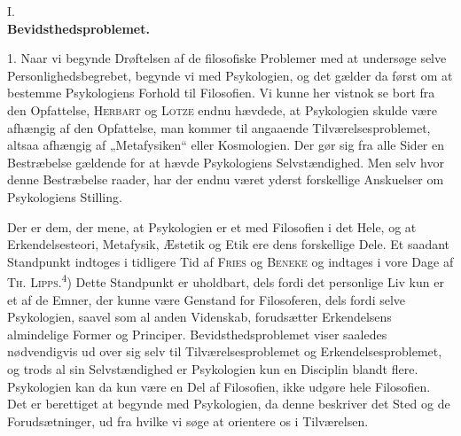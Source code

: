 \documentclass[12pt,a4paper,openany]{book}
\newcommand{\opage}[1]{\marginnote{\footnotesize\textit{[#1]}}}
\begin{document}
\opage{6}

\begin{center}I.\\[6pt]
\textbf{\Large Bevidsthedsproblemet.}\end{center}

1. Naar vi begynde Drøftelsen af de filosofiske Problemer med at undersøge
selve Personlighedsbegrebet, begynde vi med Psykologien, og det gælder da først
om at bestemme Psykologiens Forhold til Filosofien. Vi kunne her vistnok se
bort fra den Opfattelse, \textsc{Herbart} og \textsc{Lotze} endnu hævdede, at
Psykologien skulde være afhængig af den Opfattelse, man kommer til angaaende
Tilværelsesproblemet, altsaa afhængig af „Metafysiken“ eller Kosmologien. Der
gør sig fra alle Sider en Bestræbelse gældende for at hævde Psykologiens
Selvstændighed. Men selv hvor denne Bestræbelse raader, har der endnu været
yderst forskellige Anskuelser om Psykologiens Stilling.

Der er dem, der mene, at Psykologien er et med Filosofien i det Hele, og at
Erkendelsesteori, Metafysik, Æstetik og Etik ere dens forskellige Dele. Et
saadant Standpunkt indtoges i tidligere Tid af \textsc{Fries} og
\textsc{Beneke} og indtages i vore Dage af \textsc{Th.
Lipps}.\textsuperscript{4}) Dette Standpunkt er uholdbart, dels fordi det
personlige Liv kun er et af de Emner, der kunne være Genstand for Filosoferen,
dels fordi selve Psykologien, saavel som al anden Videnskab, forudsætter
Erkendelsens almindelige Former og Principer. Bevidsthedsproblemet viser
saaledes nødvendigvis ud over sig selv til Tilværelsesproblemet og
Erkendelsesproblemet, og trods al sin Selvstændighed er Psykologien kun en
Disciplin blandt flere. Psykologien kan da kun være en Del af Filosofien, ikke
udgøre hele Filosofien. Det er berettiget at begynde med
\opage{7}Psykologien, da denne beskriver det Sted og de Forudsætninger, ud fra
hvilke vi søge at orientere os i Tilværelsen.
\end{document}

